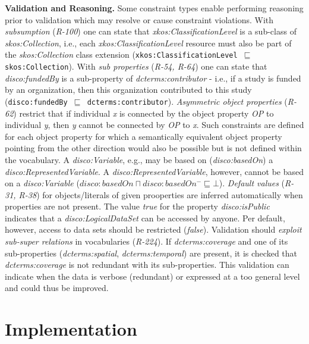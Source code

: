 \documentclass{llncs}
\newcommand{\ms}[1]{\texttt{#1}}
\begin{document}
{{\textbf{Validation and Reasoning.}
Some constraint types enable performing reasoning prior to validation which may resolve or cause constraint violations.
With \emph{subsumption} (\emph{R-100}) one can state that \emph{xkos:ClassificationLevel} is a sub-class of \emph{skos:Collection}, i.e., each \emph{xkos:ClassificationLevel} resource must also be part of the \emph{skos:Collection} class extension (\ms{xkos:ClassificationLevel $\sqsubseteq$ skos:Collection}).
With \emph{sub properties} (\emph{R-54, R-64}) one can state that \emph{disco:fundedBy} is a sub-property of \emph{dcterms:contributor} - i.e., if a study is funded by an organization, then this organization contributed to this study (\ms{disco:fundedBy $\sqsubseteq$ dcterms:contributor}).
\emph{Asymmetric object properties} (\emph{R-62}) restrict that if individual \emph{x} is connected by the object property \emph{OP} to individual \emph{y}, then \emph{y} cannot be connected by \emph{OP} to \emph{x}. 
Such constraints are defined for each object property for which a semantically equivalent object property pointing from the other direction would also be possible but is not defined within the vocabulary.
A \emph{disco:Variable}, e.g., may be based on (\emph{disco:basedOn}) a \emph{disco:RepresentedVariable}.
A \emph{disco:RepresentedVariable}, however, cannot be based on a \emph{disco:Variable} (\ms{$disco:basedOn \sqcap disco:basedOn^{-} \sqsubseteq \bot$}).
\emph{Default values} (\emph{R-31, R-38}) for objects/literals of given prooperties are inferred automatically when properties are not present.
The value \emph{true} for the property {\em disco:isPublic} indicates that a {\em disco:LogicalDataSet} can be accessed by anyone.
Per default, however, access to data sets should be restricted (\emph{false}).
Validation should \emph{exploit sub-super relations} in vocabularies (\emph{R-224}).
If \emph{dcterms:coverage} and one of its sub-properties (\emph{dcterms:spatial}, \emph{dcterms:temporal}) are present,
it is checked that \emph{dcterms:coverage} is not redundant with its sub-properties. 
This validation can indicate when the data is verbose (redundant) or expressed at a too general level and could thus be improved.

\section{Implementation}
\label{implementation}

}}
\end{document}
